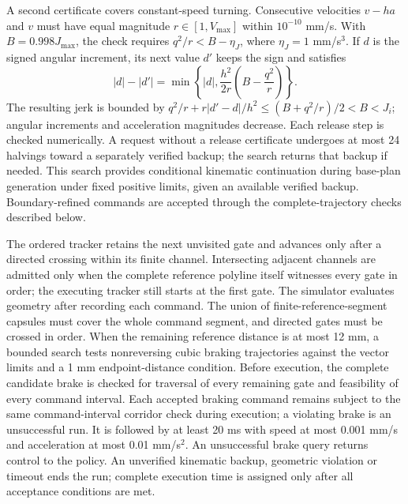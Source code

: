\documentclass[preprint,12pt]{elsarticle}
\begin{document}
A second certificate covers constant-speed turning. Consecutive velocities $v-ha$ and $v$ must have equal magnitude $r\in[1,V_{\max}]$ within $10^{-10}$ mm/s. With $B=0.998J_{\max}$, the check requires $q^2/r<B-\eta_J$, where $\eta_J=1$ mm/s$^3$. If $d$ is the signed angular increment, its next value $d'$ keeps the sign and satisfies
\begin{equation}
|d|-|d'|=\min\!\left\{|d|,\frac{h^2}{2r}\left(B-\frac{q^2}{r}\right)\right\}.
\label{eq:turn_release_main}
\end{equation}
The resulting jerk is bounded by $q^2/r+r|d'-d|/h^2\le(B+q^2/r)/2<B<J_i$; angular increments and acceleration magnitudes decrease. Each release step is checked numerically. A request without a release certificate undergoes at most 24 halvings toward a separately verified backup; the search returns that backup if needed. This search provides conditional kinematic continuation during base-plan generation under fixed positive limits, given an available verified backup. Boundary-refined commands are accepted through the complete-trajectory checks described below.

The ordered tracker retains the next unvisited gate and advances only after a directed crossing within its finite channel. Intersecting adjacent channels are admitted only when the complete reference polyline itself witnesses every gate in order; the executing tracker still starts at the first gate. The simulator evaluates geometry after recording each command. The union of finite-reference-segment capsules must cover the whole command segment, and directed gates must be crossed in order. When the remaining reference distance is at most 12 mm, a bounded search tests nonreversing cubic braking trajectories against the vector limits and a 1 mm endpoint-distance condition. Before execution, the complete candidate brake is checked for traversal of every remaining gate and feasibility of every command interval. Each accepted braking command remains subject to the same command-interval corridor check during execution; a violating brake is an unsuccessful run. It is followed by at least 20 ms with speed at most 0.001 mm/s and acceleration at most 0.01 mm/s$^2$. An unsuccessful brake query returns control to the policy. An unverified kinematic backup, geometric violation or timeout ends the run; complete execution time is assigned only after all acceptance conditions are met.


\end{document}
